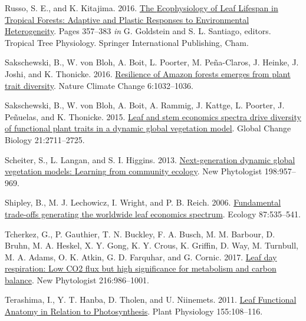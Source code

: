 \documentclass[
  12pt,
]{article}
\newlength{\cslhangindent} %
\newlength{\cslentryspacingunit} %
\newenvironment{CSLReferences}[2] %
 {%
  \setlength{\parindent}{0pt} %
  \ifodd #1 %
  \let\oldpar\par %
  \def\par{\hangindent=\cslhangindent\oldpar} %
  \fi %
  \setlength{\parskip}{#2\cslentryspacingunit} %
 }%
 {} %
\begin{document}
\begin{CSLReferences}{1}{0}
\leavevmode{}%
Russo, S. E., and K. Kitajima. 2016. \href{https://doi.org/10.1007/978-3-319-27422-5_17}{The {Ecophysiology} of {Leaf Lifespan} in {Tropical Forests}: {Adaptive} and {Plastic Responses} to {Environmental Heterogeneity}}. Pages 357--383 \emph{in} G. Goldstein and S. L. Santiago, editors. Tropical {Tree Physiology}. {Springer International Publishing}, {Cham}.

\leavevmode{}%
Sakschewski, B., W. von Bloh, A. Boit, L. Poorter, M. Peña-Claros, J. Heinke, J. Joshi, and K. Thonicke. 2016. \href{https://doi.org/10.1038/nclimate3109}{Resilience of {Amazon} forests emerges from plant trait diversity}. Nature Climate Change 6:1032--1036.

\leavevmode{}%
Sakschewski, B., W. von Bloh, A. Boit, A. Rammig, J. Kattge, L. Poorter, J. Peñuelas, and K. Thonicke. 2015. \href{https://doi.org/10.1111/gcb.12870}{Leaf and stem economics spectra drive diversity of functional plant traits in a dynamic global vegetation model}. Global Change Biology 21:2711--2725.

\leavevmode{}%
Scheiter, S., L. Langan, and S. I. Higgins. 2013. \href{https://doi.org/10.1111/nph.12210}{Next-generation dynamic global vegetation models: {Learning} from community ecology}. New Phytologist 198:957--969.

\leavevmode{}%
Shipley, B., M. J. Lechowicz, I. Wright, and P. B. Reich. 2006. \href{https://doi.org/10.1890/05-1051}{Fundamental trade-offs generating the worldwide leaf economics spectrum}. Ecology 87:535--541.

\leavevmode{}%
Tcherkez, G., P. Gauthier, T. N. Buckley, F. A. Busch, M. M. Barbour, D. Bruhn, M. A. Heskel, X. Y. Gong, K. Y. Crous, K. Griffin, D. Way, M. Turnbull, M. A. Adams, O. K. Atkin, G. D. Farquhar, and G. Cornic. 2017. \href{https://doi.org/10.1111/nph.14816}{Leaf day respiration: Low {CO2} flux but high significance for metabolism and carbon balance}. New Phytologist 216:986--1001.

\leavevmode{}%
Terashima, I., Y. T. Hanba, D. Tholen, and U. Niinemets. 2011. \href{https://doi.org/10.1104/pp.110.165472}{Leaf {Functional Anatomy} in {Relation} to {Photosynthesis}}. Plant Physiology 155:108--116.


\end{CSLReferences}
\end{document}

